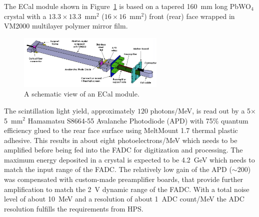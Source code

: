\documentclass[final,3p,times,twocolumn]{elsarticle}
\begin{document}
The ECal module shown in Figure~\ref{fig:ecal-module} is based on a tapered 160~mm long 
PbWO$_{4}$ crystal with a $13.3\times13.3$~mm$^2$ ($16\times16$~mm$^2$) front 
(rear) face wrapped in VM2000 multilayer polymer mirror film. 
\begin{figure}[]
\begin{center}
\includegraphics[width=7cm]{ecal-module-schematic.png}
\caption{\small A schematic view of an ECal module.
\label{fig:ecal-module}}
\end{center}
\end{figure}
The scintillation light yield, approximately $120$ photons/MeV, is read out by a 
5$\times$5~mm$^2$ Hamamatsu S8664-55 Avalanche Photodiode (APD) with 75\% quantum 
efficiency glued to the rear face surface using MeltMount 1.7 thermal plastic adhesive. This 
results in about eight photoelectrons/MeV which needs to be amplified before being fed into the FADC for digitization and 
processing. The maximum energy deposited in a crystal is expected to be 4.2~GeV which needs to 
match the input range of the FADC. The relatively low gain of the APD ($\sim$200) was compensated with 
custom-made preamplifier boards, that provide further amplification to match the 2~V dynamic range of the 
FADC. With a total noise level of about 10~MeV and a resolution of about 1~ADC count/MeV the ADC 
resolution fulfills the requirements from HPS.
\end{document}
